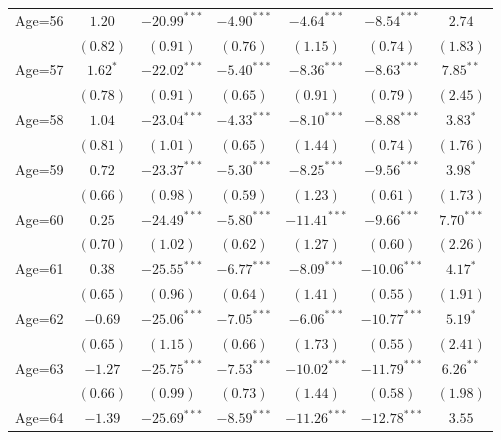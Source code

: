 \documentclass[fullpage]{paper}
\begin{document}
\begin{center}
\begin{longtable}{l c c c c c c }
Age=56      & $1.20$        & $-20.99^{***}$ & $-4.90^{***}$ & $-4.64^{***}$  & $-8.54^{***}$  & $2.74$        \\
            & $(0.82)$      & $(0.91)$       & $(0.76)$      & $(1.15)$       & $(0.74)$       & $(1.83)$      \\
Age=57      & $1.62^{*}$    & $-22.02^{***}$ & $-5.40^{***}$ & $-8.36^{***}$  & $-8.63^{***}$  & $7.85^{**}$   \\
            & $(0.78)$      & $(0.91)$       & $(0.65)$      & $(0.91)$       & $(0.79)$       & $(2.45)$      \\
Age=58      & $1.04$        & $-23.04^{***}$ & $-4.33^{***}$ & $-8.10^{***}$  & $-8.88^{***}$  & $3.83^{*}$    \\
            & $(0.81)$      & $(1.01)$       & $(0.65)$      & $(1.44)$       & $(0.74)$       & $(1.76)$      \\
Age=59      & $0.72$        & $-23.37^{***}$ & $-5.30^{***}$ & $-8.25^{***}$  & $-9.56^{***}$  & $3.98^{*}$    \\
            & $(0.66)$      & $(0.98)$       & $(0.59)$      & $(1.23)$       & $(0.61)$       & $(1.73)$      \\
Age=60      & $0.25$        & $-24.49^{***}$ & $-5.80^{***}$ & $-11.41^{***}$ & $-9.66^{***}$  & $7.70^{***}$  \\
            & $(0.70)$      & $(1.02)$       & $(0.62)$      & $(1.27)$       & $(0.60)$       & $(2.26)$      \\
Age=61      & $0.38$        & $-25.55^{***}$ & $-6.77^{***}$ & $-8.09^{***}$  & $-10.06^{***}$ & $4.17^{*}$    \\
            & $(0.65)$      & $(0.96)$       & $(0.64)$      & $(1.41)$       & $(0.55)$       & $(1.91)$      \\
Age=62      & $-0.69$       & $-25.06^{***}$ & $-7.05^{***}$ & $-6.06^{***}$  & $-10.77^{***}$ & $5.19^{*}$    \\
            & $(0.65)$      & $(1.15)$       & $(0.66)$      & $(1.73)$       & $(0.55)$       & $(2.41)$      \\
Age=63      & $-1.27$       & $-25.75^{***}$ & $-7.53^{***}$ & $-10.02^{***}$ & $-11.79^{***}$ & $6.26^{**}$   \\
            & $(0.66)$      & $(0.99)$       & $(0.73)$      & $(1.44)$       & $(0.58)$       & $(1.98)$      \\
Age=64      & $-1.39$       & $-25.69^{***}$ & $-8.59^{***}$ & $-11.26^{***}$ & $-12.78^{***}$ & $3.55$        \\

\end{longtable}
\end{center}
\end{document}
